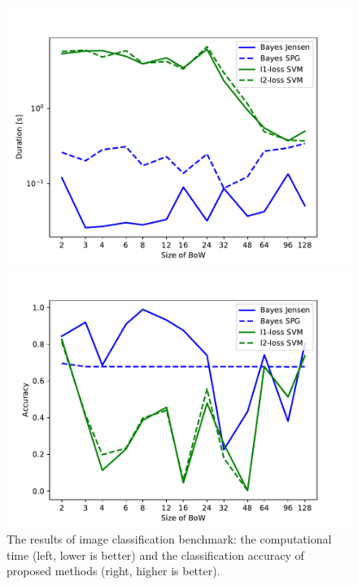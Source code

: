 \documentclass{aip-cp}
\begin{document}
\begin{figure}[!ht]
    \centering
    \begin{minipage}{.5\textwidth}
        \centering
        \includegraphics[width=\textwidth]{Figures/times.pdf}
    \end{minipage}%
    \begin{minipage}{.5\textwidth}
        \centering
        \includegraphics[width=\textwidth]{Figures/score.pdf}
    \end{minipage}
    \caption{The results of image classification benchmark: the computational time (left, lower is better) and the classification accuracy of proposed methods (right, higher is better).}
    \label{fig:results:graph}
\end{figure}
\end{document}
